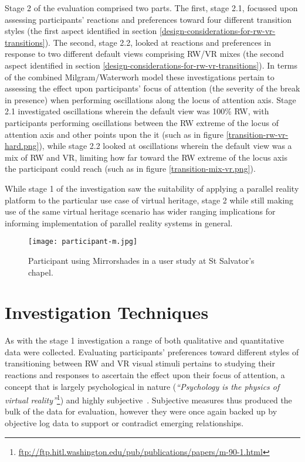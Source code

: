 Stage 2 of the evaluation comprised two parts. The first, stage 2.1, focussed upon assessing participants' reactions and preferences toward four different transition styles (the first aspect identified in section \ref{design-considerations-for-rw-vr-transitions}). The second, stage 2.2, looked at reactions and preferences in response to two different default views comprising RW/VR mixes (the second aspect identified in section \ref{design-considerations-for-rw-vr-transitions}). In terms of the combined Milgram/Waterworh model these investigations pertain to assessing the effect upon participants' focus of attention (the severity of the break in presence) when performing oscillations along the locus of attention axis. Stage 2.1 investigated oscillations wherein the default view was 100\% RW, with participants performing oscillations between the RW extreme of the locus of attention axis and other points upon the it (such as in figure \ref{transition-rw-vr-hard.png}), while stage 2.2 looked at oscillations wherein the default view was a mix of RW and VR, limiting how far toward the RW extreme of the locus axis the participant could reach (such as in figure \ref{transition-mix-vr.png}).

While stage 1 of the investigation saw the suitability of applying a parallel reality platform to the particular use case of virtual heritage, stage 2 while still making use of the same virtual heritage scenario has wider ranging implications for informing implementation of parallel reality systems in general.

\begin{figure}[ht]
	\begin{center}
		\texttt{[image: participant-m.jpg]}
		\caption{Participant using Mirrorshades in a user study at St Salvator's chapel.}
		\label{participant-m.jpg}
	\end{center}
\end{figure}


\section{Investigation Techniques}

As with the stage 1 investigation a range of both qualitative and quantitative data were collected. Evaluating participants' preferences toward different styles of transitioning between RW and VR visual stimuli pertains to studying their reactions and responses to ascertain the effect upon their focus of attention, a concept that is largely psychological in nature (\textit{``Psychology is the physics of virtual reality''}\footnote{\url{ftp://ftp.hitl.washington.edu/pub/publications/papers/m-90-1.html}}) and highly subjective~\cite{Ijsselsteijn2001}. Subjective measures thus produced the bulk of the data for evaluation, however they were once again backed up by objective log data to support or contradict emerging relationships.

